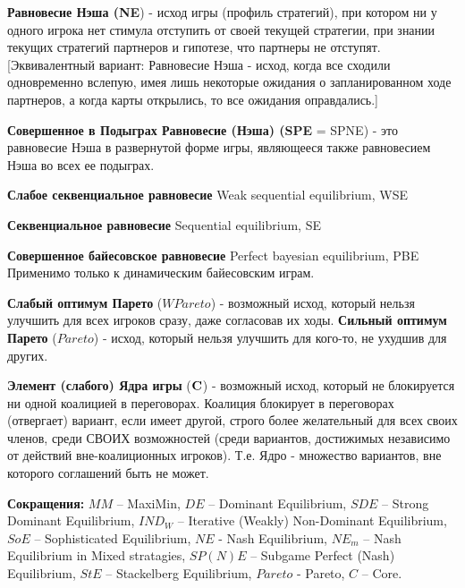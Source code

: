 \documentclass[12pt, a4paper]{article}
\def\Par{Pareto} %
\theoremstyle{exersize}
\numberwithin{problem}{section}
\begin{document}
\textbf{Равновесие Нэша (NE}) -  исход игры
(профиль стратегий), при котором ни у одного игрока
нет стимула отступить от своей текущей стратегии,
при знании текущих стратегий партнеров и гипотезе,
что партнеры не отступят. [Эквивалентный вариант:
Равновесие Нэша - исход, когда все сходили
одновременно вслепую, имея лишь некоторые ожидания
о запланированном ходе партнеров, а когда карты
открылись, то все ожидания
оправдались.]\vspace{2mm}

\textbf{Совершенное в Подыграх Равновесие (Нэша)
(SPE} = SPNE) - это равновесие Нэша в развернутой
форме игры, являющееся также равновесием Нэша во
всех ее подыграх.

\vspace{2mm}


\textbf{Слабое секвенциальное равновесие} Weak sequential equilibrium, WSE

\vspace{2mm}


\textbf{Секвенциальное равновесие} Sequential equilibrium, SE

\vspace{2mm}

\textbf{Совершенное байесовское равновесие} Perfect bayesian equilibrium, PBE
Применимо только к динамическим байесовским играм.
\vspace{2mm}






\textbf{Слабый оптимум Парето} ($W\Par$) -
возможный исход, который нельзя улучшить для всех
игроков сразу, даже согласовав их ходы.
\textbf{Сильный оптимум Парето} ($\Par$) - исход,
который нельзя улучшить для кого-то, не ухудшив для
других. \vspace{2mm}

\textbf{Элемент (слабого) Ядра игры} (${\bf C}$) -
возможный исход, который не блокируется ни одной
коалицией в переговорах. Коалиция блокирует в
переговорах (отвергает) вариант, если имеет другой,
строго более желательный для всех своих членов,
среди СВОИХ возможностей (среди вариантов,
достижимых независимо от действий вне-коалиционных
игроков). Т.е. Ядро - множество вариантов, вне
которого соглашений быть не может. \vspace{2mm}

{\bf Сокращения:}  $MM$ -- MaxiMin, $DE$ --
Dominant Equilibrium, $SDE$ -- Strong Dominant
Equilibrium, $IND_W$ -- Iterative (Weakly)
Non-Dominant Equilibrium,  $SoE$ -- Sophisticated
Equilibrium, $NE$ - Nash Equilibrium,  $NE_m$ --
Nash Equilibrium in Mixed stratagies, $SP(N)E$ --
Subgame Perfect (Nash) Equilibrium, $StE$ --
Stackelberg Equilibrium, $\Par$ - Pareto, $C$ --
Core. \vspace{2mm}
\end{document}
